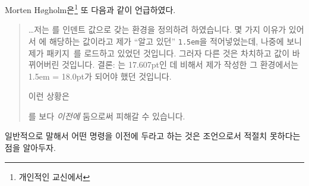 Morten H{\o}gholm은\footnote{개인적인 교신에서} 또 다음과 같이 언급하였다.
\begin{quotation}
\ldots 저는 \lnc{\parindent}를 인덴트 값으로 갖는 환경을 정의하려 하였습니다.
몇 가지 이유가 있어서 \lnc{\parindent}에 해당하는 값이라고 제가 “알고 있던”
\verb?1.5em?을 적어넣었는데, 나중에 보니 제가  패키지~\cite{MATHPAZO}를 로드하고 있었던 것입니다.
그러자 다른 것은 차치하고 \lnc{\parindent} 값이 바뀌어버린 것입니다.
결론: \lnc{\parindent}는 17.607pt인 데 비해서 제가 작성한 그 환경에서는
1.5em = 18.0pt가 되어야 했던 것입니다.

이런 상황은 
\begin{center}
\cmd{\RequirePackage}\cmd{\normalfont}
\end{center}
를 \cmd{\documentclass}보다 \emph{이전에} 둠으로써 피해갈 수 있습니다.
\end{quotation}
일반적으로 말해서 어떤 명령을 \cmd{\documentclass} 이전에 두라고 하는 것은
조언으로서 적절치 못하다는 점을 알아두자.




